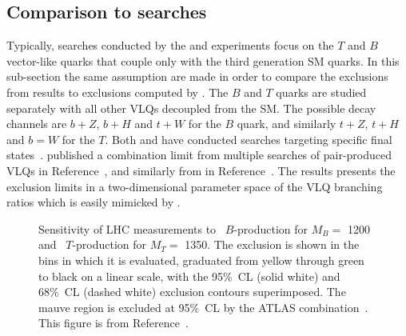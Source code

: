 \subsection{Comparison to \ATLAS searches}
Typically, searches conducted by the \ATLAS and \CMS experiments focus on the $T$ and $B$ vector-like quarks that couple only with the third generation SM quarks. In this sub-section the same assumption are made in order to compare the exclusions from \LHC results to exclusions computed by \contur. The $B$ and $T$ quarks are studied separately with all other VLQs decoupled from the SM. The possible decay channels are $b + Z$, $b + H$ and $t + W$ for the $B$ quark, and similarly $t + Z$, $t + H$ and $b = W$ for the $T$. Both \ATLAS and \CMS have conducted searches targeting specific final states~. \ATLAS published a combination limit from multiple searches of pair-produced VLQs in Reference~\cite{ATLAS_VLQ_combination}, and similarly from \CMS in Reference~\cite{Sirunyan_2018}. The \ATLAS results presents the exclusion limits in a two-dimensional parameter space of the VLQ branching ratios which is easily mimicked by \contur.
\begin{figure}[tbp]
    \vspace{-0.4cm}
    \caption{Sensitivity of LHC measurements to
    \protect{}~$B$-production for $M_B =$ \unit{1200}{\GeV} and
    \protect{}~$T$-production for $M_T =$ \unit{1350}{\GeV}.
    The \contur exclusion is shown in the bins in which it is evaluated,
    graduated from yellow through green to black on a linear scale, with the 95\%~CL (solid white)
    and 68\%~CL (dashed white) exclusion contours superimposed. The mauve region
    is excluded at 95\%~CL by the ATLAS combination~\cite{Aaboud:2018pii}. This figure is from Reference~\cite{VLQ_contur}.}
    \label{fig:BTonly}
\end{figure}

